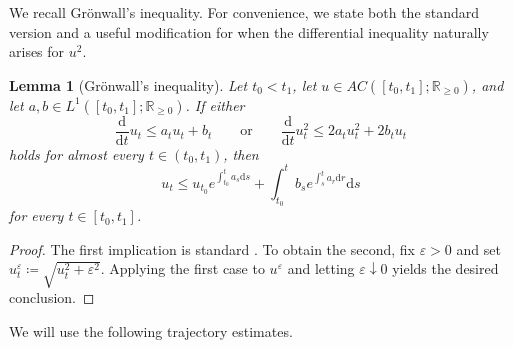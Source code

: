 \documentclass[twoside,11pt]{article}
\theoremstyle{plain}
\newtheorem{lemma}[theorem]{Lemma}
\def\R{\mathbb R}
\def\E{\mathbb E}
\newcommand{\diff}{\mathrm{d}}
\newcommand{\bfF}{\mathbf{F}}
\newcommand{\bfx}{\mathbf{x}}
\newcommand{\bfz}{\mathbf{z}}
\begin{document}

We recall Grönwall's inequality. For convenience, we state both the standard version and a useful modification for when the differential inequality naturally arises for $u^2$.

\begin{lemma}[Grönwall's inequality]\label{lemma:gronwall}
Let $t_0<t_1$, let $u\in{AC}([t_0,t_1];\R_{\geq0})$, and let $a,b\in L^1([t_0,t_1];\R_{\geq0})$. If either
\[
\frac{\diff}{\diff t}u_t\leq a_tu_t+b_t\qquad\text{or}\qquad\frac{\diff}{\diff t}u_t^2 \leq 2a_tu_t^2+2b_tu_t
\]
holds for almost every $t\in(t_0,t_1)$, then
\[
u_t \leq u_{t_0}e^{\int_{t_0}^t a_s\diff s} + \int_{t_0}^t b_s e^{\int_s^t a_r\diff r}\diff s
\]
for every $t\in[t_0,t_1]$.
\end{lemma}
\begin{proof}
The first implication is standard \cite[Appendix~B.2.j]{evans_pde}. To obtain the second, fix $\varepsilon>0$ and set $u_t^\varepsilon\coloneqq\sqrt{u_t^2+\varepsilon^2}$. Applying the first case to $u^\varepsilon$ and letting $\varepsilon\downarrow0$ yields the desired conclusion.
\end{proof}

We will use the following trajectory estimates.
\end{document}
